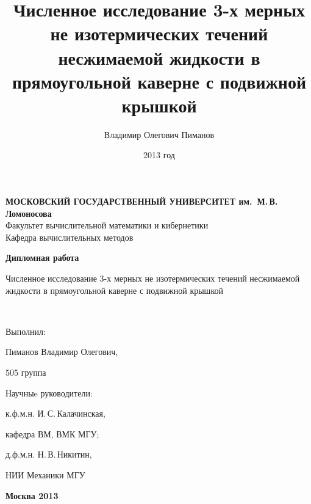 \documentclass{scrartcl}
\title{Численное исследование 3-х мерных не изотермических течений несжимаемой жидкости в прямоугольной каверне с подвижной крышкой}
\author{Владимир Олегович Пиманов}
\date{2013 год}
\begin{document}

\thispagestyle{empty}
\begin{center}
{\bfseries МОСКОВСКИЙ ГОСУДАРСТВЕННЫЙ УНИВЕРСИТЕТ им.~М.{\,}В.{\,}Ломоносова}\\
\vspace{2ex}Факультет вычислительной математики и кибернетики \\
\vspace{2ex}Кафедра вычислительных методов \\
\end{center}

\vfill

\begin{center}
{\huge {\bfseries Дипломная работа

\vspace*{1cm}

Численное исследование 3-х мерных не изотермических течений несжимаемой жидкости в прямоугольной каверне с подвижной крышкой} \\[25mm]}

\end{center}

\vfill 

\hspace*{7cm} Выполнил:

\hspace*{7cm} Пиманов Владимир Олегович,

\hspace*{7cm} 505 группа

\hspace*{7cm} Научныe руководители:

\hspace*{7cm} к.ф.м.н. И.{\,}С.{\,}Калачинская,

\hspace*{7cm} кафедра ВМ, ВМК МГУ;

\hspace*{7cm} д.ф.м.н. Н.{\,}В.{\,}Никитин,

\hspace*{7cm} НИИ Механики МГУ

\bigskip

\vfill

\begin{center}
{\bfseries Москва 2013}
\end{center}
\end{document}
